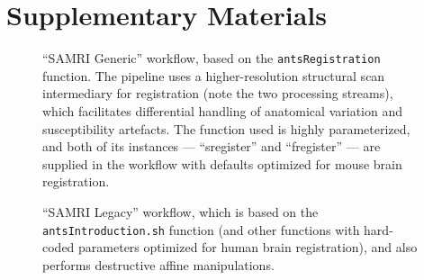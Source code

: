 \renewcommand{\thetable}{S\arabic{table}}
\setcounter{figure}{0}
\renewcommand{\thefigure}{S\arabic{figure}}

\section{Supplementary Materials}

\begin{figure*}[h!]
	\begin{subfigure}{.64\textwidth}
		\centering
		\vspace{1.4em}
		\caption{
			“SAMRI Generic”  workflow, based on the \textcolor{mg}{\texttt{antsRegistration}} function.
			The pipeline uses a higher-resolution structural scan intermediary for registration (note the two processing streams), which facilitates differential handling of anatomical variation and susceptibility artefacts.
			The function used is highly parameterized, and both of its instances --- “s\niceus register” and “f\niceus register” --- are supplied in the workflow with defaults optimized for mouse brain registration.
			}
		\label{fig:nwfgg}
	\end{subfigure}\hfill
	\begin{subfigure}{.34\textwidth}
		\centering
		\vspace{-1.9em}
		\caption{
			“SAMRI Legacy” workflow, which is based on the \textcolor{mg}{\texttt{antsIntroduction.sh}} function (and other functions with hard-coded parameters optimized for human brain registration), and also performs destructive affine manipulations.
			}
		\label{fig:nwfgl}
	\end{subfigure}
	\caption{
		Directed acyclic graphs detailing the precise node names (as seen in the SAMRI source code) for the two alternate MRI registration workflows.
		The package correspondence of each processing node is appended in parentheses to the node name.
		The “utility” indication corresponds to nodes based on Python functions specific to the workflow, distributed alongside it, and dynamically wrapped via Nipype.
		The “extra\niceus interfaces” indication corresponds to nodes using explicitly defined Nipype-style interfaces, which are specific to the workflow and distributed alongside it.
		}
	\label{fig:nwfg}
\end{figure*}


